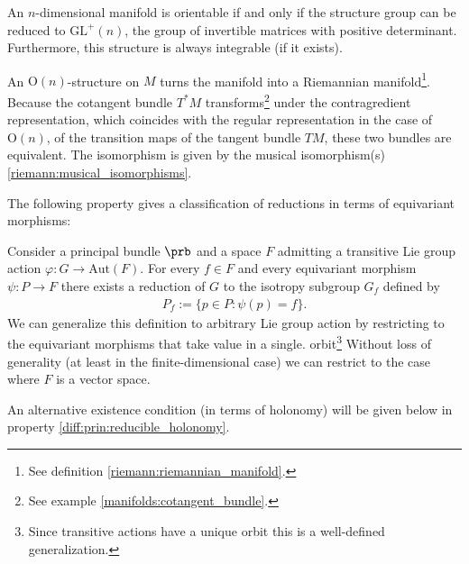
    \begin{example}\label{diff:orientable_structure}
        An $n$-dimensional manifold is orientable if and only if the structure group can be reduced to $\text{GL}^+(n)$, the group of invertible matrices with positive determinant. Furthermore, this structure is always integrable (if it exists).
    \end{example}
    \begin{example}
        An $\text{O}(n)$-structure on $M$ turns the manifold into a Riemannian manifold\footnote{See definition \ref{riemann:riemannian_manifold}.}. Because the cotangent bundle $T^*M$ transforms\footnote{See example \ref{manifolds:cotangent_bundle}.} under the contragredient representation, which coincides with the regular representation in the case of $\text{O}(n)$, of the transition maps of the tangent bundle $TM$, these two bundles are equivalent. The isomorphism is given by the musical isomorphism(s) \ref{riemann:musical_isomorphisms}.
    \end{example}

    The following property gives a classification of reductions in terms of equivariant morphisms:
    \begin{property}\label{diff:prin:reduction_classification}
        Consider a principal bundle $\prb$ and a space $F$ admitting a transitive Lie group action $\varphi:G\rightarrow\text{Aut}(F)$. For every $f\in F$ and
        every equivariant morphism $\psi:P\rightarrow F$ there exists a reduction of $G$ to the isotropy subgroup $G_f$ defined by
        \begin{gather}
            P_f := \{p\in P:\psi(p) = f\}.
        \end{gather}
        We can generalize this definition to arbitrary Lie group action by restricting to the equivariant morphisms that take value in a single. orbit\footnote{Since transitive actions have a unique orbit this is a well-defined generalization.} Without loss of generality (at least in the finite-dimensional case) we can restrict to the case where $F$ is a vector space.
    \end{property}
    An alternative existence condition (in terms of holonomy) will be given below in property \ref{diff:prin:reducible_holonomy}.

